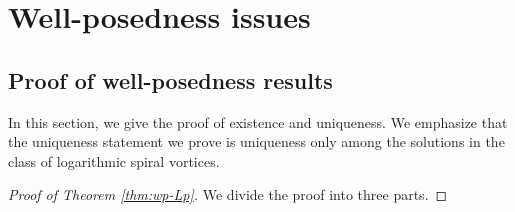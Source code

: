 \documentclass[10pt]{article}
\theoremstyle{definition}
\theoremstyle{remark}
\numberwithin{equation}{section}
\newcommand{\0}{\emptyset}
\begin{document}
	
	\section{Well-posedness issues}\label{sec:wp}
	
	\subsection{Proof of well-posedness results}

In this section, we give the proof of existence and uniqueness. We emphasize that the uniqueness statement we prove is uniqueness only among the solutions  in the class of logarithmic spiral vortices.

 
	\begin{proof}[Proof of Theorem \ref{thm:wp-Lp}]
		
		We divide the proof into three parts. 
		
		\medskip
		

\end{proof}
\end{document}
